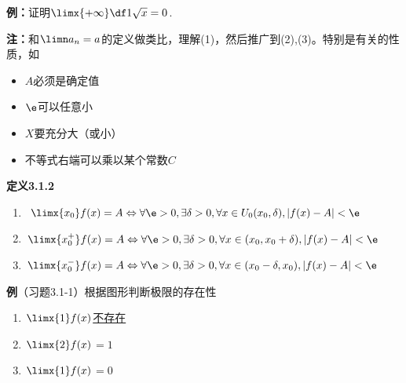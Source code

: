 {\bf 例：}证明$\limx{+\infty}\df1{\sqrt x}=0$.

{\bf 注：}和$\limn a_n=a$的定义做类比，理解(1)，然后推广到(2),(3)。特别是有关的性质，如
\begin{itemize}
  \setlength{\itemindent}{1cm}
  \item $A$必须是确定值
  \item $\e$可以任意小
  \item $X$要充分大（或小）
  \item 不等式右端可以乘以某个常数$C$
\end{itemize}

{\bf 定义3.1.2}
\begin{enumerate}[(1)]
  \setlength{\itemindent}{1cm}
  \item $\limx{x_0}f(x)=A\Leftrightarrow\forall \e>0,\exists\delta>0,\forall
  x\in U_0(x_0,\delta),|f(x)-A|<\e$
  \item $\limx{x_0^+}f(x)=A\Leftrightarrow\forall \e>0,\exists\delta>0,\forall
  x\in(x_0,x_0+\delta),|f(x)-A|<\e$
  \item $\limx{x_0^-}f(x)=A\Leftrightarrow\forall \e>0,\exists\delta>0,\forall
  x\in(x_0-\delta,x_0),|f(x)-A|<\e$
\end{enumerate}

{\bf 例}（习题3.1-1）根据图形判断极限的存在性
\begin{center}
\end{center}
\begin{enumerate}[(1)]
  \setlength{\itemindent}{1cm}
  \item $\limx{1}f(x)$\underline{不存在}
  \item $\limx{2}f(x)$\underline{$=1$}
  \item $\limx{1}f(x)$\underline{$=0$}
\end{enumerate}

